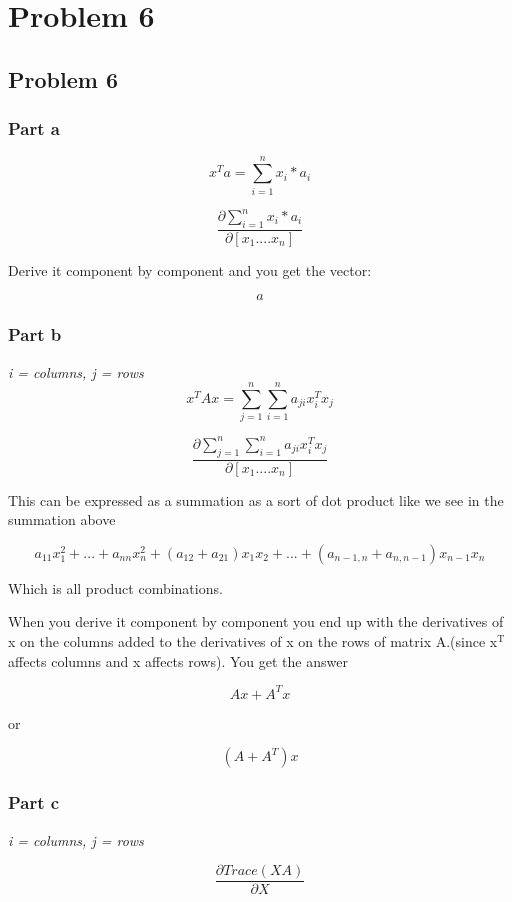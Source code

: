 \documentclass[11pt]{article}
\begin{document}
\section{Problem 6}
\label{sec-6}

\subsection{Problem 6}
\label{sec-6-1}
\subsubsection{Part a}
\label{sec-6-1-1}

$$ x^T a = \sum_{i=1}^{n} x_i * a_i $$

$$ \dfrac{ \partial \sum_{i=1}^{n} x_i * a_i }{ \partial [x_1 .... x_n] }$$

Derive it component by component and you get the vector:

$$ a $$

\subsubsection{Part b}
\label{sec-6-1-2}
\emph{i = columns, j = rows}
$$ x^T A x = \sum_{j=1}^{n} \sum_{i=1}^{n} a_{ji} x^T_i x_j $$

$$ \dfrac{ \partial \sum_{j=1}^{n} \sum_{i=1}^{n} a_{ji} x^T_i x_j }{ \partial [x_1 .... x_n] }$$

This can be expressed as a summation as a sort of dot product like we see in the summation above

$$ a_{11} x_1^2 + ... + a_{nn} x_n^2 + (a_{12} + a_{21})x_1 x_2 + ... + (a_{n-1,n} + a_{n,n-1}) x_{n-1} x_{n} $$

Which is all product combinations.

When you derive it component by component you end up with the derivatives of x on the columns added to the derivatives of x on the rows of matrix A.(since x$^{\text{T}}$ affects columns and x affects rows). You get the answer

$$ Ax + A^T x $$

or

$$ (A + A^T)x $$

\subsubsection{Part c}
\label{sec-6-1-3}
\emph{i = columns, j = rows}

$$ \dfrac{ \partial Trace(XA)}{ \partial X} $$
\end{document}
